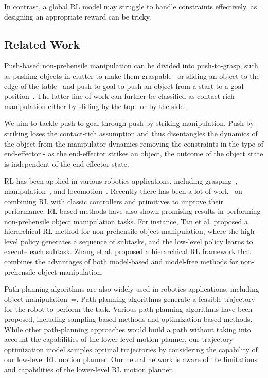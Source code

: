 In contrast, a global RL model may struggle to handle constraints effectively, as designing an appropriate reward can be tricky. 

\subsection{Related Work}

Push-based non-prehensile manipulation can be divided into push-to-grasp, such as pushing objects in clutter to make them graspable~\cite{huang2021dipn, huang2021visual} or sliding an object to the edge of the table~\cite{pregraspsliding, King-2013-7735} and push-to-goal to push an object from a start to a goal position~\cite{iros2022, icra2018, moura2022non, bai2021hierarchical-more}. The latter line of work can further be classified as contact-rich manipulation either by sliding by the top~\cite{xu2021cocoi, song2019object, icra2018, iros2022} or by the side~\cite{moura2022non}. 

We aim to tackle push-to-goal through push-by-striking manipulation. Push-by-striking loses the contact-rich assumption and thus disentangles the dynamics of the object from the manipulator dynamics removing the constraints in the type of end-effector - as the end-effector strikes an object, the outcome of the object state is independent of the end-effector state. 

RL has been applied in various robotics applications, including grasping~\cite{grasp1, grasp2,grasp3}, manipulation~\cite{manipulation1, manipulation2}, and locomotion~\cite{locomotion1, locomotion2}. Recently there has been a lot of work~\cite{residual1, residual2, residual3} on combining RL with classic controllers and primitives to improve their performance. RL-based methods have also shown promising results in performing non-prehensile object manipulation tasks. For instance, Tan et al.\cite{hierarchical-rl} proposed a hierarchical RL method for non-prehensile object manipulation, where the high-level policy generates a sequence of subtasks, and the low-level policy learns to execute each subtask. Zhang et al.\cite{zhang-rl} proposed a hierarchical RL framework that combines the advantages of both model-based and model-free methods for non-prehensile object manipulation.

Path planning algorithms are also widely used in robotics applications, including object manipulation~=\cite{planning1, planning2, planning3}. Path planning algorithms generate a feasible trajectory for the robot to perform the task. Various path-planning algorithms have been proposed, including sampling-based methods\cite{planning1} and optimization-based methods\cite{planning2}. While other path-planning approaches would build a path without taking into account the capabilities of the lower-level motion planner, our trajectory optimization model samples optimal trajectories by considering the capability of our low-level RL motion planner. Our neural network is aware of the limitations and capabilities of the lower-level RL motion planner. 

